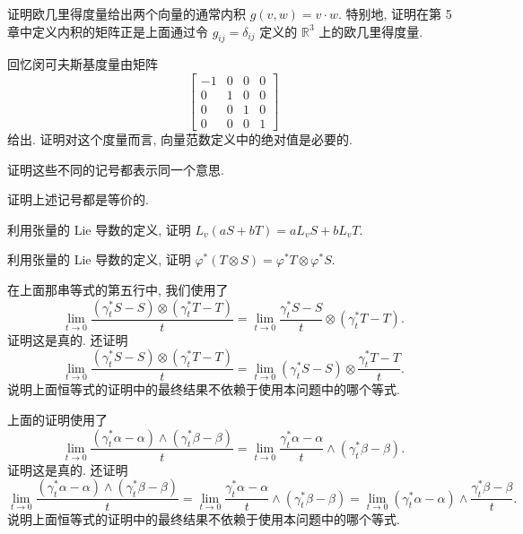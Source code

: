 \begin{question}\label{q:A-6}
证明欧几里得度量给出两个向量的通常内积 $g(v,w)=v\cdot w$. 特别地, 证明在第 5 章中定义内积的矩阵正是上面通过令 $g_{ij}=\delta_{ij}$ 定义的 $\mathbb{R}^3$ 上的欧几里得度量.
\end{question}

\begin{question}\label{q:A-7}
回忆闵可夫斯基度量由矩阵
\[
\begin{bmatrix}-1&0&0&0\\0&1&0&0\\0&0&1&0\\0&0&0&1\end{bmatrix}
\]
给出. 证明对这个度量而言, 向量范数定义中的绝对值是必要的.
\end{question}

\begin{question}\label{q:A-8}
证明这些不同的记号都表示同一个意思.
\end{question}

\begin{question}\label{q:A-9}
证明上述记号都是等价的.
\end{question}

\begin{question}\label{q:A-10}
利用张量的 Lie 导数的定义, 证明 $L_v\left(aS+bT\right)=aL_vS+bL_vT$.
\end{question}

\begin{question}\label{q:A-11}
利用张量的 Lie 导数的定义, 证明 $\varphi^*\left(T\otimes S\right)=\varphi^*T\otimes\varphi^*S$.
\end{question}

\begin{question}\label{q:A-12}
在上面那串等式的第五行中, 我们使用了
\[
\lim_{t\to0}\frac{(\gamma_t^*S-S)\otimes(\gamma_t^*T-T)}{t}=\lim_{t\to0}\frac{\gamma_t^*S-S}{t}\otimes(\gamma_t^*T-T).
\]
证明这是真的. 还证明
\[
\lim_{t\to0}\frac{(\gamma_t^*S-S)\otimes(\gamma_t^*T-T)}{t}=\lim_{t\to0}(\gamma_t^*S-S)\otimes\frac{\gamma_t^*T-T}{t}.
\]
说明上面恒等式的证明中的最终结果不依赖于使用本问题中的哪个等式.
\end{question}

\begin{question}\label{q:A-13}
上面的证明使用了
\[
\lim_{t\to0}\frac{(\gamma_t^*\alpha-\alpha)\wedge(\gamma_t^*\beta-\beta)}{t}=\lim_{t\to0}\frac{\gamma_t^*\alpha-\alpha}{t}\wedge(\gamma_t^*\beta-\beta).
\]
证明这是真的. 还证明
\[
\lim_{t\to0}\frac{(\gamma_t^*\alpha-\alpha)\wedge(\gamma_t^*\beta-\beta)}{t}
=\lim_{t\to0}\frac{\gamma_t^*\alpha-\alpha}{t}\wedge(\gamma_t^*\beta-\beta)
=\lim_{t\to0}(\gamma_t^*\alpha-\alpha)\wedge\frac{\gamma_t^*\beta-\beta}{t}.
\]
说明上面恒等式的证明中的最终结果不依赖于使用本问题中的哪个等式.
\end{question}

